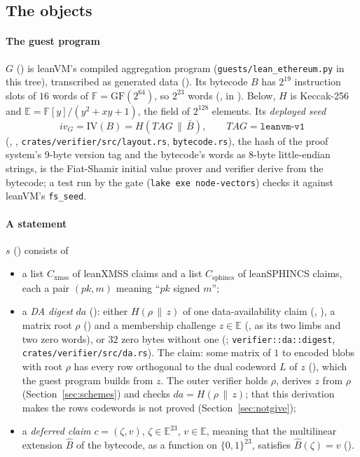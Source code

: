 \documentclass[11pt]{article}
\newcommand{\Cx}{C_{\mathrm{xmss}}}
\newcommand{\Cs}{C_{\mathrm{sphincs}}}
\begin{document}
\subsection{The objects}

\paragraph{The guest program} $G$ () is leanVM's compiled aggregation
program (\texttt{guests/lean\_ethereum.py} in this tree),
transcribed as generated data (). Its bytecode $B$ has $2^{19}$ instruction
slots of $16$ words of $\mathbb{F} = \mathrm{GF}(2^{64})$, so $2^{23}$ words
(, in ). Below, $H$ is Keccak-256 and
$\mathbb{E} = \mathbb{F}[y]/(y^2+xy+1)$, the field of $2^{128}$ elements. Its \emph{deployed seed}
\[
iv_G = \mathrm{IV}(B) = H(\mathit{TAG} \,\|\, \bar B), \qquad \mathit{TAG} = \texttt{leanvm-v1}
\]
(, , \texttt{crates/verifier/src/layout.rs},
\texttt{bytecode.rs}), the hash of the proof system's $9$-byte version tag and the bytecode's
words as $8$-byte little-endian strings, is the Fiat-Shamir initial value prover and verifier
derive from the bytecode; a test run by the gate (\texttt{lake exe node-vectors}) checks it against
leanVM's \texttt{fs\_seed}.

\paragraph{A statement} $s$ () consists of
\begin{itemize}
\item a list $\Cx$ of leanXMSS claims and a list $\Cs$ of leanSPHINCS claims, each a pair $(pk, m)$
meaning ``$pk$ signed $m$'';
\item a \emph{DA digest} $\mathit{da}$ (): either $H(\rho \,\|\, z)$ of one
data-availability claim (, ), a matrix root $\rho$
() and a membership challenge $z \in \mathbb{E}$ (, as its
two limbs and two zero words), or $32$ zero bytes without one (;
\texttt{verifier::da::digest}, \texttt{crates/verifier/src/da.rs}). The claim: some matrix of
$1$ to  encoded blobs with root $\rho$ has every row orthogonal to the dual codeword $L$ of $z$
(), which the guest program builds from $z$. The outer verifier holds
$\rho$, derives $z$ from $\rho$ (Section~\ref{sec:schemes}) and checks $\mathit{da} = H(\rho \,\|\, z)$; that
this derivation makes the rows codewords is not proved (Section~\ref{sec:notgive});
\item a \emph{deferred claim} $c = (\zeta, v)$, $\zeta \in \mathbb{E}^{23}$, $v \in \mathbb{E}$, meaning
that the multilinear extension $\widehat{B}$ of the bytecode, as a function on $\{0,1\}^{23}$,
satisfies $\widehat{B}(\zeta) = v$ ().
\end{itemize}
\end{document}
